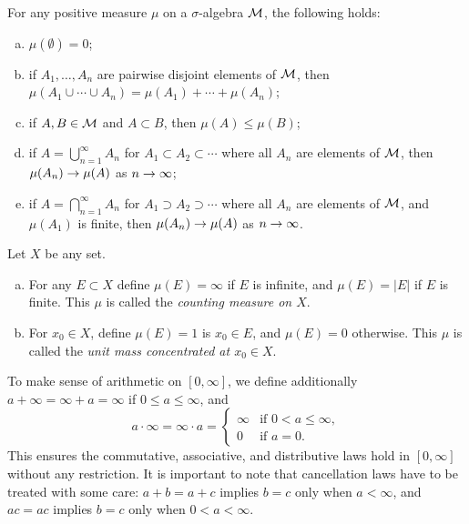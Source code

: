 \begin{theorem}
  For any positive measure $\mu$ on a $\sigma$-algebra $\mathcal{M}$, the following holds:
  \begin{enumerate}[(a)]
  \item $\mu(\emptyset) = 0$;
  \item if $A_1, \dots, A_n$ are pairwise disjoint elements of $\mathcal{M}$, then $\mu(A_1 \cup \cdots \cup A_n) = \mu(A_1) + \cdots + \mu(A_n)$;
  \item if $A, B \in \mathcal{M}$ and $A \subset B$, then $\mu(A) \leq \mu(B)$;
  \item if $A = \bigcup_{n=1}^\infty A_n$ for $A_1 \subset A_2 \subset \cdots$ where all $A_n$ are elements of $\mathcal{M}$, then $\mu(A_n) \rightarrow \mu(A)$ as $n \rightarrow \infty$;
  \item if $A = \bigcap_{n=1}^\infty A_n$ for $A_1 \supset A_2 \supset \cdots$ where all $A_n$ are elements of $\mathcal{M}$, and $\mu(A_1)$ is finite, then $\mu(A_n) \rightarrow \mu(A)$ as $n \rightarrow \infty$.
  \end{enumerate}
\end{theorem}

\begin{example}
  Let $X$ be any set.
  \begin{enumerate}[(a)]
  \item For any $E \subset X$ define $\mu(E) = \infty$ if $E$ is infinite, and $\mu(E) = |E|$ if $E$ is finite. This $\mu$ is called the \emph{counting measure on $X$}.
  \item For $x_0 \in X$, define $\mu(E) = 1$ is $x_0 \in E$, and $\mu(E) = 0$ otherwise. This $\mu$ is called the \emph{unit mass concentrated at $x_0 \in X$}.
  \end{enumerate}
\end{example}

To make sense of arithmetic on $[0,\infty]$, we define additionally $a + \infty = \infty + a = \infty$ if $0 \leq a \leq \infty$, and
\[
a \cdot \infty = \infty \cdot a =
\begin{cases}
  \infty & \textrm{if } 0 < a \leq \infty, \\
  0 & \textrm{if } a = 0.
\end{cases}
\]
This ensures the commutative, associative, and distributive laws hold in $[0,\infty]$ without any restriction. It is important to note that cancellation laws have to be treated with some care: $a + b = a + c$ implies $b=c$ only when $a < \infty$, and $ac = ac$ implies $b=c$ only when $0 < a < \infty$.

